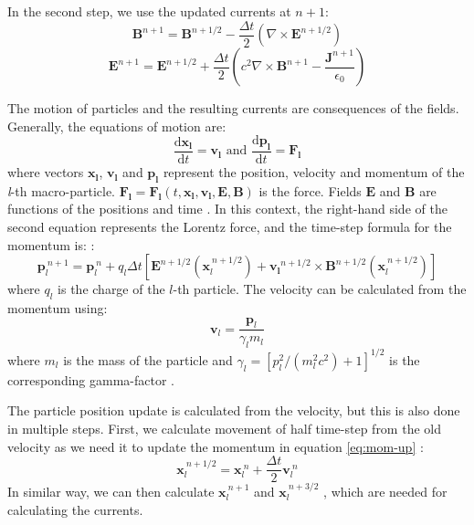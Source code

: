 In the second step, we use the updated currents at $n+1$:
\begin{equation} 
	\bm{B}^{n+1} = \bm{B}^{n+1/2} - \frac{\Delta t}{2}\left(\nabla\times\bm{E}^{n+1/2} \right)
\end{equation}
\begin{equation}
	\bm{E}^{n+1} = \bm{E}^{n+1/2} + \frac{\Delta t}{2}\left(c^2 \nabla\times\bm{B}^{n+1} - \frac{\bm{J}^{n+1}}{\epsilon_0}\right)
\end{equation}

The motion of particles and the resulting currents are consequences of the fields. Generally, the equations of motion are:
\begin{equation}
	\frac{\mathrm{d}\bm{x_l}}{\mathrm{d}t} = \bm{v_l} \text{   and   }  \frac{\mathrm{d}\bm{p_l}}{\mathrm{d}t} = \bm{F_l}
\end{equation}
where vectors $\bm{x_l}$,  $\bm{v_l}$  and $\bm{p_l}$ represent the position, velocity and momentum of the \textit{l}-th macro-particle. $\bm{F_l}=\bm{F_l}(t,\bm{x_l},\bm{v_l},\bm{E},\bm{B})$ is the force. Fields $\bm{E}$ and $\bm{B}$ are functions of the positions and time \cite{tskhakaya2007}.
In this context, the right-hand side of the second equation represents the Lorentz force, and the time-step formula for the momentum is: \cite{arber2015}:
\begin{equation}
	\bm{p}^{~n+1}_{l} = \bm{p}^{~n}_l + q_l\Delta t \left[\bm{E}^{n+1/2}\left(\bm{x}_l^{~n+1/2}\right)+\bm{v_l}^{n+1/2}\times \bm{B}^{n+1/2}\left(\bm{x}_l^{~n+1/2}\right) \right] 
	\label{eq:mom-up}
\end{equation}
where $q_l$ is the charge of the $l$-th particle. The velocity can be calculated from the momentum using:
\begin{equation}
	\bm{v}_l = \frac{\bm{p}_l}{\gamma_l m_l}
\end{equation}
where $m_l$ is the mass of the particle and $\gamma_l = [p_l^2/(m_l^2 c^2)+1]^{1/2}$ is the corresponding gamma-factor \cite{arber2015}.

The particle position update is calculated from the velocity, but this is also done in multiple steps. First, we calculate movement of half time-step from the old velocity as we need it to update the momentum in equation \ref{eq:mom-up} \cite{arber2015}:
\begin{equation}
	\bm{x}^{~n+1/2}_{l} = \bm{x}^{~n}_l + \frac{\Delta t}{2} \bm{v}^{~n}_l  
\end{equation}
In similar way, we can then calculate $\bm{x}^{~n+1}_l$ and $\bm{x}^{~n+3/2}_l$ \cite{arber2015}, which are needed for calculating the currents.

